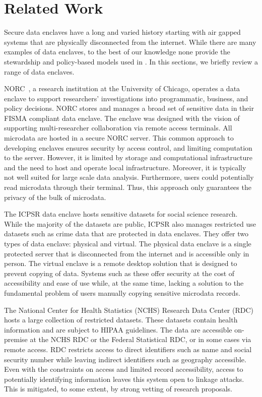 \section{Related Work}

Secure data enclaves have a long and varied history starting with air gapped systems that are physically
disconnected from the internet.
While there are many examples of data enclaves, to the best of our knowledge none provide 
the stewardship and policy-based models used in \NAMENS. In this sections, we briefly review a range of data enclaves. 

NORC~\cite{lane2008using}, a research institution at the University of Chicago, operates a
data enclave to support researchers' investigations into programmatic, business, and policy decisions. 
NORC stores and manages a broad set of sensitive data in their FISMA compliant data enclave. The enclave
was designed with the vision of supporting multi-researcher collaboration via remote access terminals.
All microdata are hosted in a secure NORC server. 
This common approach to developing enclaves ensures security by access control, and limiting computation
to the server. However, it is limited by storage and computational infrastructure and the need to
host and operate local infrastructure. Moreover, it is typically not well
suited for large scale data analysis. Furthermore, users could potentially read microdata through 
their terminal. Thus, this approach only guarantees the privacy of the bulk of microdata.

The ICPSR data enclave \cite{icpsr} hosts sensitive datasets
for social science research. While the majority of the datasets are public, ICPSR
also manages restricted use datasets such as crime
data that are protected in data enclaves. They offer two types of data enclave: physical
and virtual. The physical data enclave is a single protected server that is disconnected
from the internet and is accessible only in person. The virtual enclave is a remote desktop solution that is designed
to prevent copying of data. Systems such as these offer security at the cost of accessibility and ease of use while, at
the same time, lacking a solution to the fundamental problem of users manually copying sensitive microdata records.

The National Center for Health Statistics (NCHS) Research Data Center (RDC) \cite{cdc} hosts a large collection of
restricted datasets. These datasets contain health information and are subject to HIPAA guidelines.
The data are accessible on-premise at the NCHS RDC or the Federal Statistical RDC, or in some
cases via remote access. 
RDC restricts access to direct identifiers such as name and 
social security number while leaving indirect identifiers such as geography accessible. Even with the constraints
on access and limited record accessibility, access to potentially identifying information leaves this system open to
linkage attacks. This is mitigated, to some extent, by strong vetting of research proposals.


